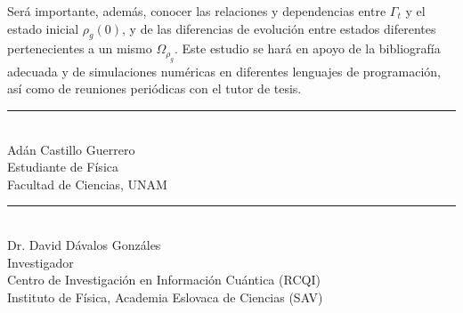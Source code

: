 \documentclass[onecolumn,11pt]{article}
\begin{document}
Será importante, además, conocer las relaciones y dependencias entre $\Gamma_{t}$ y el estado inicial $\rho_{g}(0)$, y de las diferencias de evolución entre estados diferentes pertenecientes a un mismo $\Omega_{\rho_{g}}$. Este estudio se hará en apoyo de la bibliografía adecuada y de simulaciones numéricas en diferentes lenguajes de programación, así como de reuniones periódicas con el tutor de tesis.

\vspace{3.0cm}


\begin{center}
    \rule{200pt}{0.4pt}\\
    Adán Castillo Guerrero \\
    Estudiante de Física \\
    Facultad de Ciencias, UNAM \\
    
\end{center}

\vspace{1.0cm}

\begin{center}
    \rule{200pt}{0.4pt}\\
    Dr. David Dávalos Gonzáles \\
    Investigador \\
    Centro de Investigación en Información Cuántica (RCQI)\\
    Instituto de Física, Academia Eslovaca de Ciencias (SAV)
\end{center}


\end{document}
